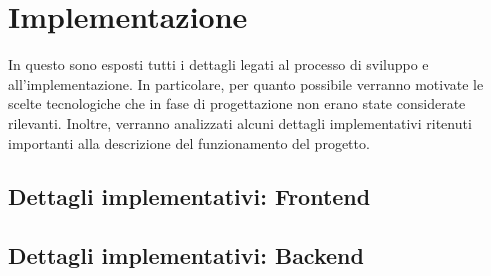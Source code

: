 \chapter{Implementazione}\label{ch:implementation}
  In questo  sono esposti tutti i dettagli legati al processo di sviluppo e all'implementazione.
  In particolare, per quanto possibile verranno motivate le scelte tecnologiche che in fase di progettazione non erano state considerate rilevanti.
  Inoltre, verranno analizzati alcuni dettagli implementativi ritenuti importanti alla descrizione del funzionamento del progetto.

  

  \section{Dettagli implementativi: Frontend}
  \section{Dettagli implementativi: Backend}
